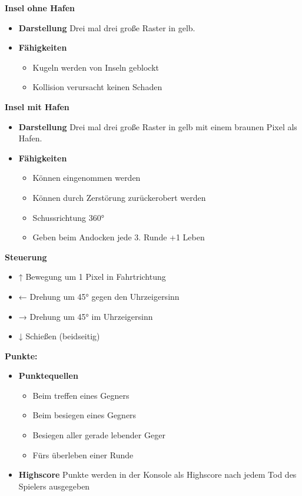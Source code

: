 \documentclass{article}
\begin{document}
\textbf{Insel ohne Hafen}
\begin{itemize}
    \item \textbf{Darstellung}
        \newline
        Drei mal drei große Raster in gelb.
    \item \textbf{Fähigkeiten}
        \begin{itemize}
            \item Kugeln werden von Inseln geblockt
            \item Kollision verursacht keinen Schaden
        \end{itemize}
\end{itemize}

\textbf{Insel mit Hafen}
\begin{itemize}
    \item \textbf{Darstellung}
        \newline
        Drei mal drei große Raster in gelb mit einem braunen Pixel als Hafen.
    \item \textbf{Fähigkeiten}
        \begin{itemize}
            \item Können eingenommen werden
            \item Können durch Zerstörung zurückerobert werden
            \item Schussrichtung 360°
            \item Geben beim Andocken jede 3. Runde +1 Leben
        \end{itemize}
\end{itemize}

\textbf{Steuerung}
\begin{itemize}
    \item ↑ Bewegung um 1 Pixel in Fahrtrichtung
    \item ← Drehung um 45° gegen den Uhrzeigersinn
    \item → Drehung um 45° im Uhrzeigersinn
    \item ↓ Schießen (beidseitig)
\end{itemize}
\textbf{Punkte:}
\begin{itemize}
    \item \textbf{Punktequellen}
\begin{itemize}
    \item Beim treffen eines Gegners
    \item Beim besiegen eines Gegners
    \item Besiegen aller gerade lebender Geger
    \item Fürs überleben einer Runde
\end{itemize}
    \item \textbf{Highscore}
        \newline
        Punkte werden in der Konsole als Highscore nach jedem Tod des Spielers ausgegeben
\end{itemize}
\newpage
\end{document}
